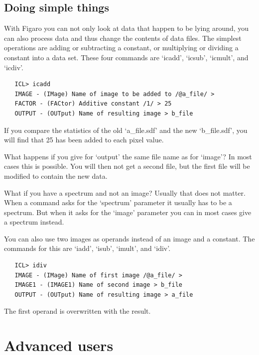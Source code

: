 \documentclass[11pt,twoside]{article}
\newcommand{\stardocinitials}  {SUN}
\newcommand{\stardocnumber}    { 86.21}
\newcommand{\stardocname}{\stardocinitials /\stardocnumber}
\newcommand{\xlabel}[1]{}
\begin{document}

\subsection{\xlabel{arithm}\label{arithm}Doing simple things}

   With Figaro you can not only look at data that happen to be lying
   around, you can also process data and thus change the contents of
   data files. The simplest operations are adding or subtracting a
   constant, or multiplying or dividing a constant into a data set.
   These four commands are `icadd', `icsub', `icmult', and
   `icdiv'.

\begin{verbatim}
   ICL> icadd
   IMAGE - (IMage) Name of image to be added to /@a_file/ >
   FACTOR - (FACtor) Additive constant /1/ > 25
   OUTPUT - (OUTput) Name of resulting image > b_file
\end{verbatim}

   If you compare the statistics of the old `a\_file.sdf' and the new
   `b\_file.sdf', you will find that 25 has been added to each pixel
   value.

   What happens if you give for `output' the same file name as for
   `image'? In most cases this is possible. You will then not get a
   second file, but the first file will be modified to contain the new
   data.

   What if you have a spectrum and not an image? Usually that does not
   matter. When a command asks for the `spectrum' parameter it usually
   has to be a spectrum. But when it asks for the `image' parameter
   you can in most cases give a spectrum instead.

   You can also use two images as operands instead of an image and a
   constant. The commands for this are `iadd', `isub', `imult',
   and `idiv'.

\begin{verbatim}
   ICL> idiv
   IMAGE - (IMage) Name of first image /@a_file/ >
   IMAGE1 - (IMAGE1) Name of second image > b_file
   OUTPUT - (OUTput) Name of resulting image > a_file
\end{verbatim}

   The first operand is overwritten with the result.


\newpage %
\section{\xlabel{advanced}\label{advanced}Advanced users}
\markboth{Advanced users}{\stardocname}
\end{document}
